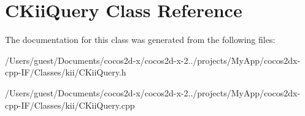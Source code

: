 \hypertarget{class_c_kii_query}{\section{C\-Kii\-Query Class Reference}
\label{class_c_kii_query}
}


The documentation for this class was generated from the following files\-:\begin{DoxyCompactItemize}
\item 
/\-Users/guest/\-Documents/cocos2d-\/x/cocos2d-\/x-\/2../projects/\-My\-App/cocos2dx-\/cpp-\/\-I\-F/\-Classes/kii/C\-Kii\-Query.\-h\item 
/\-Users/guest/\-Documents/cocos2d-\/x/cocos2d-\/x-\/2../projects/\-My\-App/cocos2dx-\/cpp-\/\-I\-F/\-Classes/kii/C\-Kii\-Query.\-cpp\end{DoxyCompactItemize}
